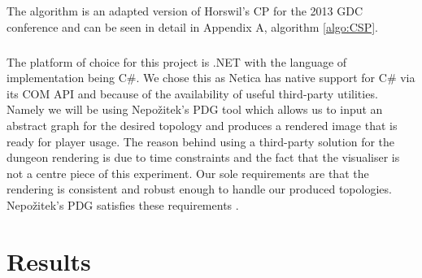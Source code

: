 \documentclass{UoYCSproject}
\begin{document}
The algorithm is an adapted version of Horswil's CP for the 2013 GDC conference \parencite{HorswillCPInAWeekend} and can be seen in detail in Appendix A, algorithm \ref{algo:CSP}.

\paragraph{}
The platform of choice for this project is .NET with the language of implementation being C\#. We chose this as Netica has native support for C\# via its COM API and because of the availability of useful third-party utilities. Namely we will be using Nepo\v{z}itek's PDG tool \parencite{levelGenerator} which allows us to input an abstract graph for the desired topology and produces a rendered image that is ready for player usage. The reason behind using a third-party solution for the dungeon rendering is due to time constraints and the fact that the visualiser is not a centre piece of this experiment. Our sole requirements are that the rendering is consistent and robust enough to handle our produced topologies. Nepo\v{z}itek's PDG satisfies these requirements \parencite{Nepozitek2018FASTCT}.

\chapter{Results}
\label{cha:results}
\end{document}
